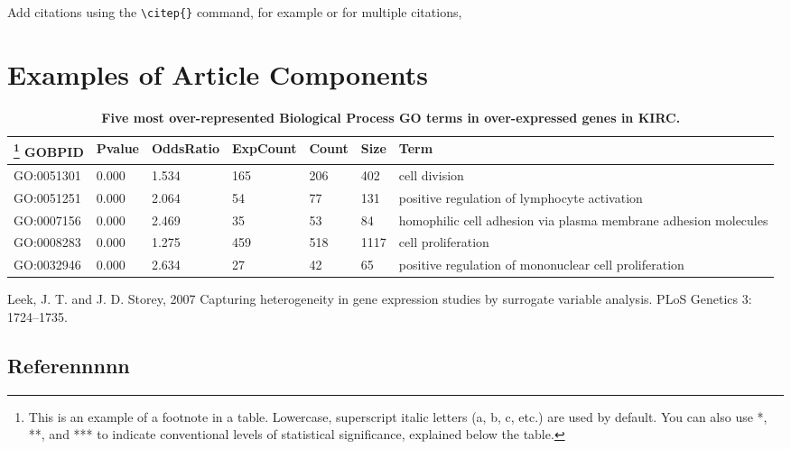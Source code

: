 \documentclass[9pt,twocolumn,twoside]{gsajnl}
\begin{document}
Add citations using the \verb|\citep{}| command, for example \citep{neher2013genealogies} or for multiple citations, \citep{neher2013genealogies, rodelsperger2014characterization}

\section*{Examples of Article Components}


\newcolumntype{b}{X}
\begin{table}[htbp]
\centering
\caption{\bf Five most over-represented Biological Process GO terms in over-expressed genes in KIRC. }
\begin{tableminipage}{\textwidth}
\begin{tabularx}{\textwidth}{ssssssb}
\hline
\footnote{This is an example of a footnote in a table. Lowercase, superscript italic letters (a, b, c, etc.) are used by default. You can also use *, **, and *** to indicate conventional levels of statistical significance, explained below the table.}
GOBPID & Pvalue & OddsRatio & ExpCount & Count & Size & Term\\
\hline
GO:0051301 & 0.000 & 1.534 & 165 & 206 & 402 & cell division\\
GO:0051251 & 0.000 & 2.064 & 54 & 77 & 131 & positive regulation of lymphocyte activation\\
GO:0007156 & 0.000 & 2.469 & 35 & 53 & 84 & homophilic cell adhesion via plasma membrane adhesion molecules\\
GO:0008283 & 0.000 & 1.275 & 459 & 518 & 1117 & cell proliferation\\
GO:0032946 & 0.000 & 2.634 & 27 & 42 & 65 & positive regulation of mononuclear cell proliferation\\
\hline
\end{tabularx}
  \label{tab:shape-functions}
\end{tableminipage}
\end{table}

Leek, J. T. and J. D. Storey, 2007 Capturing heterogeneity in gene expression studies by surrogate variable analysis. PLoS Genetics 3: 1724–1735.

\subsection*{Referennnnn}


\end{document}
